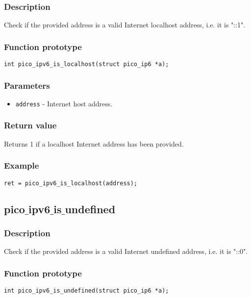 \subsubsection*{Description}
Check if the provided address is a valid Internet localhost address, i.e. it is "::1".
\subsubsection*{Function prototype}
\begin{verbatim}
int pico_ipv6_is_localhost(struct pico_ip6 *a);
\end{verbatim}
\subsubsection*{Parameters}
\begin{itemize}[noitemsep]
\item \texttt{address} - Internet host address.
\end{itemize}
\subsubsection*{Return value}
Returns 1 if a localhost Internet address has been provided.
\subsubsection*{Example}
\begin{verbatim}
ret = pico_ipv6_is_localhost(address);
\end{verbatim}

\subsection{pico$\_$ipv6$\_$is$\_$undefined}
\subsubsection*{Description}
Check if the provided address is a valid Internet undefined address, i.e. it is "::0".
\subsubsection*{Function prototype}
\begin{verbatim}
int pico_ipv6_is_undefined(struct pico_ip6 *a);
\end{verbatim}
